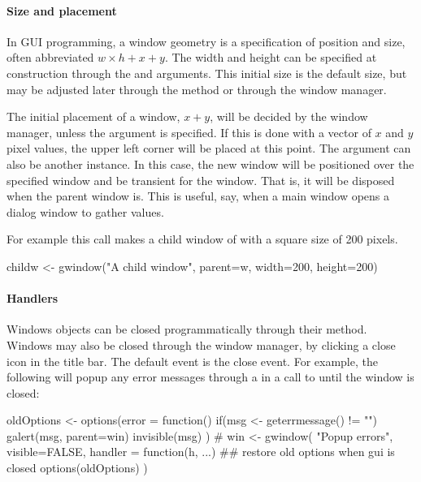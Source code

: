 \paragraph{Size and placement}
In GUI programming, a window geometry is a specification of position
and size, often abbreviated $w \times h + x + y$. The width and height
can be specified at construction through the 
and  arguments. This initial size is the
default size, but may be adjusted later through the
 method or through the window manager. 

The initial placement of a window, $x+y$, will be decided by the
window manager, unless the  argument is
specified. If this is done with a vector of $x$ and $y$ pixel values,
the upper left corner will be placed at this point. The 
argument can also be another  instance. In this case,
the new window will be positioned over the specified window and be
transient for the window. That is, it will be disposed when the parent
window is. This is useful, say, when a main window opens a dialog
window to gather values.

For example this call makes a child window of  with a square
size of 200 pixels.
\begin{Schunk}
\begin{Sinput}
 childw <- gwindow("A child window", parent=w, 
                   width=200, height=200)
\end{Sinput}
\end{Schunk}


\paragraph{Handlers}
Windows objects can be closed programmatically through their
 method. Windows may also be closed through
the window manager, by clicking a close icon in the title bar. The
default event is the close event. For example, the following will
popup any error messages through a in a call to  until
the window is closed:

\begin{Schunk}
\begin{Sinput}
 oldOptions <- options(error = function() {
   if(msg <- geterrmessage() != "")
     galert(msg, parent=win)
   invisible(msg)
 })
 #
 win <- gwindow( "Popup errors", visible=FALSE,
                handler = function(h, ...) {
                  ## restore old options when gui is closed
                  options(oldOptions)       
                })
\end{Sinput}
\end{Schunk}


